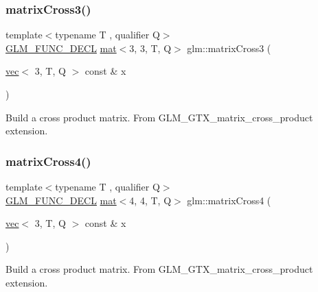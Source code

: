 \subsubsection{\texorpdfstring{matrix\+Cross3()}{matrixCross3()}}
{\footnotesize\ttfamily template$<$typename T , qualifier Q$>$ \\
\hyperlink{setup_8hpp_ab2d052de21a70539923e9bcbf6e83a51}{G\+L\+M\+\_\+\+F\+U\+N\+C\+\_\+\+D\+E\+CL} \hyperlink{structglm_1_1mat}{mat}$<$3, 3, T, Q$>$ glm\+::matrix\+Cross3 (\begin{DoxyParamCaption}\item[{\hyperlink{structglm_1_1vec}{vec}$<$ 3, T, Q $>$ const \&}]{x }\end{DoxyParamCaption})}

Build a cross product matrix. From G\+L\+M\+\_\+\+G\+T\+X\+\_\+matrix\+\_\+cross\+\_\+product extension. \mbox{\label{group__gtx__matrix__cross__product_ga20057fff91ddafa102934adb25458cde}} 
\subsubsection{\texorpdfstring{matrix\+Cross4()}{matrixCross4()}}
{\footnotesize\ttfamily template$<$typename T , qualifier Q$>$ \\
\hyperlink{setup_8hpp_ab2d052de21a70539923e9bcbf6e83a51}{G\+L\+M\+\_\+\+F\+U\+N\+C\+\_\+\+D\+E\+CL} \hyperlink{structglm_1_1mat}{mat}$<$4, 4, T, Q$>$ glm\+::matrix\+Cross4 (\begin{DoxyParamCaption}\item[{\hyperlink{structglm_1_1vec}{vec}$<$ 3, T, Q $>$ const \&}]{x }\end{DoxyParamCaption})}

Build a cross product matrix. From G\+L\+M\+\_\+\+G\+T\+X\+\_\+matrix\+\_\+cross\+\_\+product extension. 